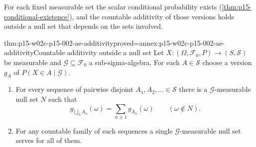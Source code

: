 For each fixed measurable set the scalar conditional probability exists
(\cref{thm:p15-conditional-existence}), and the countable additivity of
those versions holds outside a null set that depends on the sets
involved.

\begin{hblemma}{thm:p15-w02c-p15-002-ae-additivity}{proved=annex:p15-w02c-p15-002-ae-additivity}{Countable additivity outside a null set}
Let \(X:(\Omega,\mathcal F_0,P)\to(S,\mathcal S)\) be measurable and
\(\mathcal G\subseteq\mathcal F_0\) a sub-sigma-algebra. For each
\(A\in\mathcal S\) choose a version \(g_A\) of \(P(X\in A\mid\mathcal G)\).
\begin{enumerate}
\item For every sequence of pairwise disjoint \(A_1,A_2,\ldots\in\mathcal S\)
      there is a \(\mathcal G\)-measurable null set \(N\) such that
      \[
       g_{\bigcup_nA_n}(\omega)=\sum_{n\geq1}g_{A_n}(\omega)
                                    \qquad(\omega\notin N).
      \]
\item For any countable family of such sequences a single
      \(\mathcal G\)-measurable null set serves for all of them.
\end{enumerate}
\end{hblemma}

